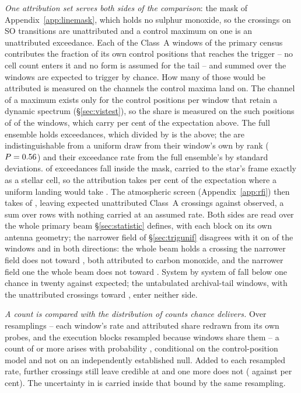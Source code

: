 \emph{One attribution set serves both sides of the comparison}: the mask of
Appendix~\ref{app:linemask}, which holds no sulphur monoxide, so the
\SoNCrossWord{} crossings on SO transitions are unattributed and a control
maximum on one is an unattributed exceedance. Each of the \CeNWin{} Class~A
windows of the primary census contributes the fraction of its own \NCtrl{}
control positions that reaches the trigger -- no cell count enters it and no
form is assumed for the tail -- and summed over the windows \CeExpTrig{} are
expected to trigger by chance. How many of those would be attributed is
measured on the channels the control maxima land on. The channel of a maximum exists only for the
\RcNRetCtrl{} control positions per window that retain a dynamic spectrum
(\S\ref{sec:vistest}), so the share is measured on the \CeNExcPos{} such
positions of \CeNExcWin{} of the \CeNWin{} windows, which carry
\CeExcCovPct{} per cent of the expectation above. The full ensemble holds
\CeNExcFull{} exceedances, which divided by \NCtrl{} is the \CeExpTrig{}
above; the \RcNRetCtrl{} are indistinguishable from a uniform draw from
their window's own \NCtrl{} by rank ($P=0.56$) and their exceedance
rate from the full ensemble's by \CeRetZ{} standard deviations.
\CeNExcAttr{} of \CeNExc{} exceedances fall inside the mask, carried to the
star's frame exactly as a stellar cell, so the attribution takes \CeMaskPct{}
per cent of the expectation where a uniform landing would take \CeUnifPct.
The atmospheric screen (Appendix~\ref{app:rfi}) then takes \CeTlCtrlCut{} of
\CeTlCtrlSurv, leaving \CeExp{} expected unattributed Class~A crossings
against \CeObs{} observed, a sum over rows with nothing carried at an assumed
rate. Both sides are read over the whole primary beam \S\ref{sec:statistic}
defines, with each block on its own antenna geometry; the narrower field of
\S\ref{sec:trigunif} disagrees with it on \FrNFlag{} of the \CeNWin{} windows
and in both directions: the whole beam holds a crossing the narrower field
does not toward \FrUpStars, both attributed to carbon monoxide, and the
narrower field one the whole beam does not toward \FrDownStars. System by
system \MtNSysLowP{} of \MtNSysChance{} fall below one chance in twenty
against \MtNSysLowPExp{} expected; the \CeNWinTail{} untabulated archival-tail
windows, with the \CeNTailCrossWord{} unattributed crossings toward
\CeTailStar, enter neither side.

\emph{A count is compared with the distribution of counts chance delivers.}
Over \CeNBoot{} resamplings -- each window's rate and attributed share redrawn
from its own probes, and the execution blocks resampled because windows share
them -- a count of \CeObs{} or more arises with probability \CeProbNull{},
conditional on the control-position model and not on an independently
established null. Added to each resampled rate, \CeAddLim{} further crossings
still leave \CeObs{} credible at \CeProbAtLim{} and one more does not
(\CeProbAboveLim{} against \CeAlphaPct{} per cent). The uncertainty in
\CeExp{} is carried inside that bound by the same resampling.

